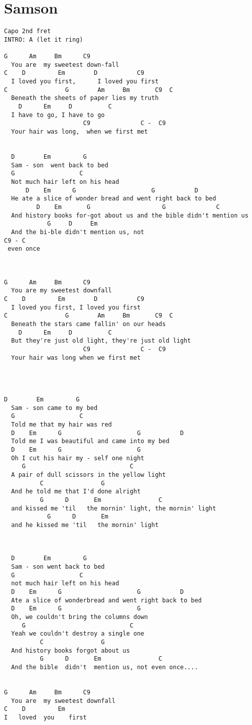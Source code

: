\documentclass[leqno]{memoir}
\begin{document}
\chapter{Samson}
\begin{verbatim}
Capo 2nd fret 
INTRO: A (let it ring)

G      Am     Bm      C9
  You are  my sweetest down-fall
C    D         Em        D           C9
  I loved you first,      I loved you first
C                G        Am     Bm       C9  C
  Beneath the sheets of paper lies my truth
    D      Em     D          C
  I have to go, I have to go
                      C9              C -  C9
  Your hair was long,  when we first met


  D        Em         G
  Sam - son  went back to bed
  G                  C
  Not much hair left on his head
      D    Em      G                     G           D
  He ate a slice of wonder bread and went right back to bed
         D    Em       G                    G              C         
  And history books for-got about us and the bible didn't mention us
            G     D     Em                         
  And the bi-ble didn't mention us, not
C9 - C
 even once

  

G      Am     Bm      C9
  You are my sweetest downfall
C    D         Em        D           C9
  I loved you first, I loved you first
C                G        Am     Bm       C9  C
  Beneath the stars came fallin' on our heads
    D      Em     D          C
  But they're just old light, they're just old light
                      C9              C -  C9
  Your hair was long when we first met

  
  
  
D        Em         G
  Sam - son came to my bed
  G                  C
  Told me that my hair was red
  D    Em      G                     G           D
  Told me I was beautiful and came into my bed
  D    Em      G                     G           
  Oh I cut his hair my - self one night
     G                             C
  A pair of dull scissors in the yellow light
          C                G
  And he told me that I'd done alright
          G      D       Em                C
  and kissed me 'til   the mornin' light, the mornin' light
            G      D       Em
  and he kissed me 'til   the mornin' light


 
  D        Em         G
  Sam - son went back to bed
  G                  C
  not much hair left on his head
  D    Em      G                     G           D
  Ate a slice of wonderbread and went right back to bed
  D    Em      G                     G           
  Oh, we couldn't bring the columns down
     G                             C
  Yeah we couldn't destroy a single one
          C                G
  And history books forgot about us
          G      D       Em                C
  And the bible  didn't  mention us, not even once....

  
G      Am     Bm      C9
  You are  my sweetest downfall
C    D         Em                  
I   loved  you    first
\end{verbatim}
\newpage
\end{document}
